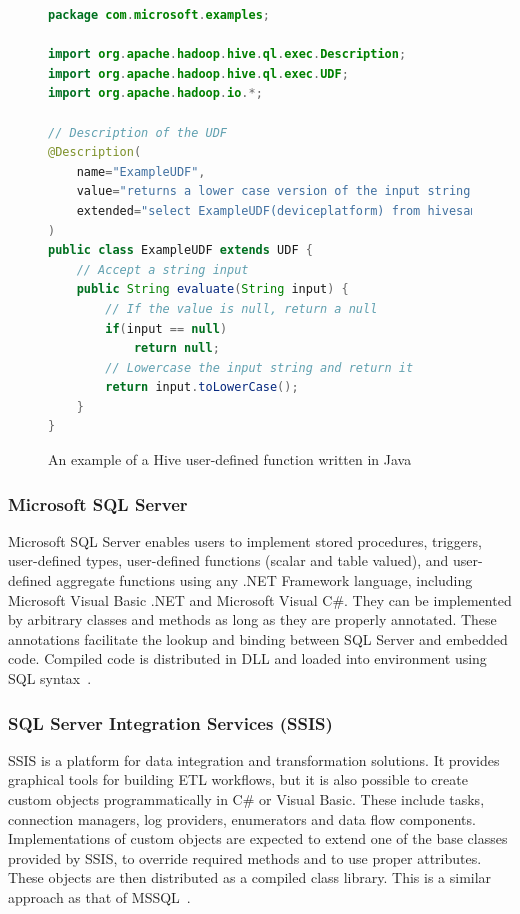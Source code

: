 \begin{figure}[ht]
\begin{lstlisting}[language=Java]
package com.microsoft.examples;

import org.apache.hadoop.hive.ql.exec.Description;
import org.apache.hadoop.hive.ql.exec.UDF;
import org.apache.hadoop.io.*;

// Description of the UDF
@Description(
    name="ExampleUDF",
    value="returns a lower case version of the input string.",
    extended="select ExampleUDF(deviceplatform) from hivesampletable limit 10;"
)
public class ExampleUDF extends UDF {
    // Accept a string input
    public String evaluate(String input) {
        // If the value is null, return a null
        if(input == null)
            return null;
        // Lowercase the input string and return it
        return input.toLowerCase();
    }
}
\end{lstlisting}
\caption{An example of a Hive user-defined function written in Java~\cite{hiveudfexample}}
\label{fig:hiveScript}
\end{figure}

\subsubsection{Microsoft SQL Server}
Microsoft SQL Server enables users to implement stored procedures, triggers, user-defined types, user-defined functions (scalar and table valued), and user-defined aggregate functions using any .NET Framework language, including Microsoft Visual Basic .NET and Microsoft Visual C\#. They can be implemented by arbitrary classes and methods as long as they are properly annotated. These annotations facilitate the lookup and binding between SQL Server and embedded code. Compiled code is distributed in DLL and loaded into environment using SQL syntax~\cite{mssql}.

\subsubsection{SQL Server Integration Services (SSIS)}
SSIS is a platform for data integration and transformation solutions. It provides graphical tools for building ETL workflows, but it is also possible to create custom objects programmatically in C\# or Visual Basic. These include tasks, connection managers, log providers, enumerators and data flow components. Implementations of custom objects are expected to extend one of the base classes provided by SSIS, to override required methods and to use proper attributes. These objects are then distributed as a compiled class library. This is a similar approach as that of MSSQL~\cite{ssis}.

